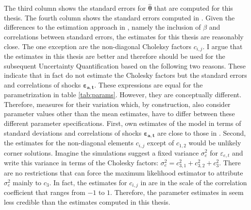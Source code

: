\noindent
The third column shows the standard errors for $\pmb{\hat{\theta}}$ that are computed for this thesis. The fourth column shows the standard errors computed in \cite{Keane.1994}. Given the differences to the estimation approach in \cite{Keane.1994}, namely the inclusion of $\beta$ and correlations between standard errors, the estimates for this thesis are reasonably close. The one exception are the non-diagonal Choleksy factors $c_{i,j}$. I argue that the estimates in this thesis are better and therefore should be used for the subsequent Uncertainty Quantification based on the following two reasons. These indicate that \cite{Keane.1994} in fact do not estimate the Cholesky factors but the standard errors and correlations of shocks $\pmb{\varepsilon_{a,t}}$. These expressions are equal for the parametrization in table \ref{tab:params}. However, they are conceptually different. Therefore, measures for their variation which, by construction, also consider parameter values other than the mean estimates, have to differ between these different parameter specifications. First, own estimates of the model in terms of standard deviations and correlations of shocks $\pmb{\varepsilon_{a,t}}$ are close to those in \cite{Keane.1994}. Second, the estimates for the non-diagonal elements $c_{i,j}$ except of $c_{1,2}$ would be unlikely corner solutions. Imagine the simulations suggest a fixed variance $\sigma_e^2$ for $\varepsilon_{e,t}$ and write this variance in terms of the Cholesky factors: $\sigma_e^2=c_{3,1}^2+c_{3,2}^2+c_{3}^2$. There are no restrictions that can force the maximum likelihood estimator to attribute $\sigma_e^2$ mainly to $c_{3}$. In fact, the estimates for $c_{i,j}$ in \cite{Keane.1994} are in the scale of the correlation coefficient that ranges from $-1$ to $1$. Therefore, the parameter estimates in \cite{Keane.1994} seem less credible than the estimates computed in this thesis.\\


